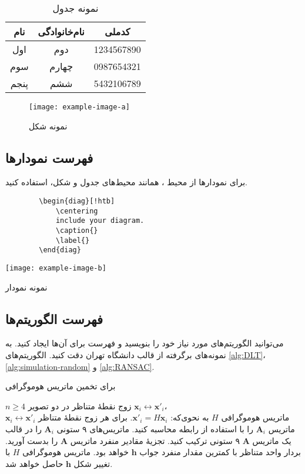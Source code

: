 \begin{table}[!htb]
	\centering
	\caption{نمونه جدول}
	\label{tab:example}
	\begin{tabular}{ccc}
		\hline
		نام & نام‌خانوادگی & کدملی
		\\\hline
		اول & دوم & 1234567890
		\\
		سوم & چهارم & 0987654321
		\\
		پنجم & ششم & 5432106789
		\\\hline
	\end{tabular}
\end{table}
\begin{figure}[!htb]
	\centering
	\texttt{[image: example-image-a]}
	\caption{نمونه شکل}
	\label{fig:example}
\end{figure}

\subsection{فهرست نمودارها}
برای نمودارها از محیط
،
همانند محیط‌های جدول و شکل، استفاده کنید.
\begin{latin}
	\begin{verbatim}
		\begin{diag}[!htb]
		    \centering
		    include your diagram.
		    \caption{}
		    \label{}
		\end{diag}
	\end{verbatim}
\end{latin}

\begin{diag}[!htb]
	\centering
	\texttt{[image: example-image-b]}
	\caption{نمونه نمودار}
	\label{}
\end{diag}

\subsection{فهرست الگوریتم‌ها}
می‌توانید الگوریتم‌های مورد نیاز خود را بنویسید و فهرست برای آن‌ها ایجاد کنید. به نمونه‌های برگرفته
از قالب دانشگاه تهران دقت کنید. الگوریتم‌های
\ref{alg:DLT}،
\ref{alg:simulation-random}
و
\ref{alg:RANSAC}.

\begin{algorithm}[!htb]
	\caption{ برای تخمین ماتریس هوموگرافی}
	\label{alg:DLT}
	\begin{algorithmic}[1]
		\REQUIRE $n\geq4$ زوج نقطهٔ متناظر در دو تصویر 
		${\mathbf{x}_i\leftrightarrow\mathbf{x}'_i}$،\\
		\ENSURE ماتریس هوموگرافی $H$ به نحوی‌که: 
		$\mathbf{x}'_i = H \mathbf{x}_i$.
		\STATE برای هر زوج نقطهٔ متناظر
		$\mathbf{x}_i\leftrightarrow\mathbf{x}'_i$ 
		ماتریس $\mathbf{A}_i$ را با استفاده از رابطه محاسبه کنید.
		\STATE ماتریس‌های ۹ ستونی  $\mathbf{A}_i$ را در قالب یک ماتریس $\mathbf{A}$ ۹ ستونی ترکیب کنید. 
		\STATE تجزیهٔ مقادیر منفرد   ماتریس $\mathbf{A}$ را بدست آورید. بردار واحد متناظر با کمترین مقدار منفرد جواب $\mathbf{h}$ خواهد بود.
		\STATE  ماتریس هوموگرافی $H$ با تغییر شکل $\mathbf{h}$ حاصل خواهد شد.
	\end{algorithmic}
\end{algorithm}

